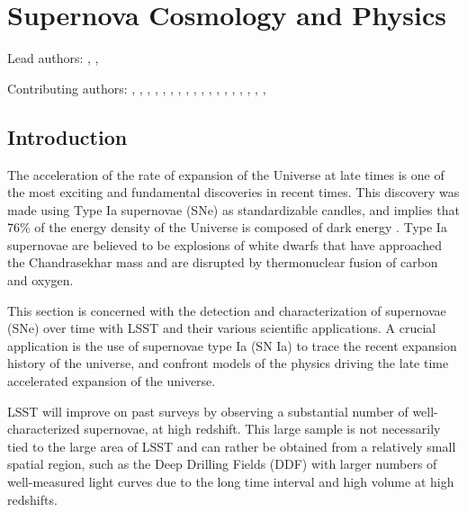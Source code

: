 %
%
%
\clearpage
\section{Supernova Cosmology and Physics}
\def\secname{supernovae}\label{sec:\secname}

\newcommand{\ml}[1]{\textcolor{red}{[{\bf ML}: #1]}}

Lead authors:
,
,

Contributing authors:
,
,
,
,
,
,
,
,
,
,
,
,
,
,
,
,
,
,

\subsection{Introduction}
The acceleration of the rate of expansion of the Universe at late times is one of the
most exciting and fundamental discoveries\citep{Riess1998,Perlmutter1999} in recent times.
This discovery was made using Type Ia supernovae (SNe) as standardizable candles, and
implies that 76\% of the energy density of the Universe is composed of dark energy
\citep{Frieman2008}. Type Ia supernovae are believed to be explosions of white
dwarfs that have approached the Chandrasekhar mass and are disrupted by
thermonuclear fusion of carbon and oxygen.


This section is concerned with the detection and characterization of
supernovae (SNe) over time with LSST and their various scientific
applications. A crucial application is the use of supernovae type
Ia (SN Ia) %
to trace the recent expansion history of the universe, and confront models of the
physics driving the late time accelerated expansion of the universe.

LSST will improve on past surveys by observing a substantial number of well-characterized
supernovae, at high redshift. This large sample is not necessarily tied to the large area of LSST
and can rather be obtained from a relatively small spatial region, such as the Deep Drilling Fields
(DDF) with larger numbers of well-measured light curves due to the long time interval and high volume
at high redshifts.

